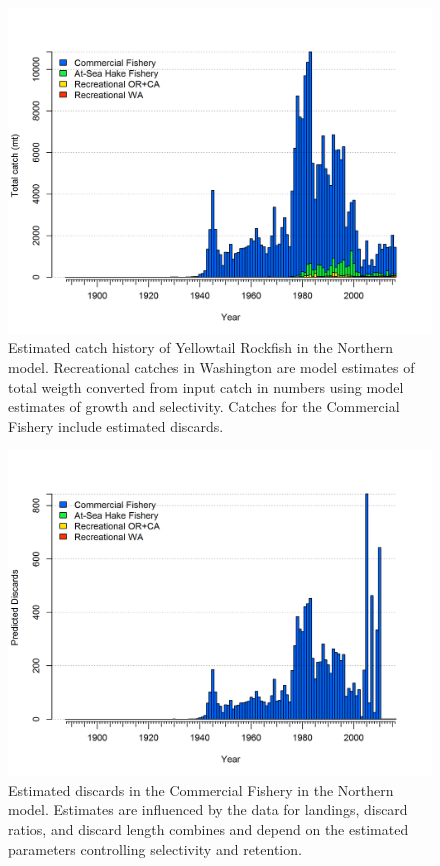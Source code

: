 \documentclass[12pt,]{article}
\begin{document}
\begin{figure}[htbp]
\centering
\includegraphics{r4ss/plots_mod1/catch5 total catch (including discards) stacked.png}
\caption{Estimated catch history of Yellowtail Rockfish in the Northern
model. Recreational catches in Washington are model estimates of total
weigth converted from input catch in numbers using model estimates of
growth and selectivity. Catches for the Commercial Fishery include
estimated discards.\label{fig:r4ss_total_catch_N}}
\end{figure}

\begin{figure}[htbp]
\centering
\includegraphics{r4ss/plots_mod1/catch7 discards stacked plot (depends on multiple fleets).png}
\caption{Estimated discards in the Commercial Fishery in the Northern
model. Estimates are influenced by the data for landings, discard
ratios, and discard length combines and depend on the estimated
parameters controlling selectivity and
retention.\label{fig:r4ss_discard_N}}
\end{figure}
\end{document}
